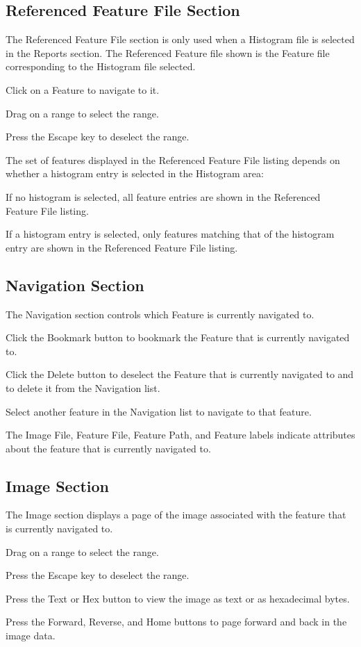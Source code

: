 \documentclass[10pt,twoside]{article}
\begin{document}
\subsection{Referenced Feature File Section}
The Referenced Feature File section is only used when a Histogram file is selected
in the Reports section.
The Referenced Feature file shown is the Feature file corresponding to the Histogram file selected.
\begin{compactitem}
\item Click on a Feature to navigate to it.
\item Drag on a range to select the range.
\item Press the Escape key to deselect the range.
\end{compactitem}
The set of features displayed in the Referenced Feature File listing
depends on whether a histogram entry is selected in the Histogram area:
\begin{compactitem}
\item If no histogram is selected, all feature entries are shown
in the Referenced Feature File listing.
\item If a histogram entry is selected,
only features matching that of the histogram entry are shown
in the Referenced Feature File listing.
\end{compactitem}

\subsection{Navigation Section}
The Navigation section controls which Feature is currently navigated to.
\begin{compactitem}
\item Click the Bookmark button to bookmark the Feature that is currently navigated to.
\item Click the Delete button to deselect the Feature that is currently navigated to
and to delete it from the Navigation list.
\item Select another feature in the Navigation list to navigate to that feature.
\item The Image File, Feature File, Feature Path, and Feature labels
indicate attributes about the feature that is currently navigated to.
\end{compactitem}
\subsection{Image Section}
The Image section displays a page of the image
associated with the feature that is currently navigated to.
\begin{compactitem}
\item Drag on a range to select the range.
\item Press the Escape key to deselect the range.
\item Press the Text or Hex button to view the image as text or as hexadecimal bytes.
\item Press the Forward, Reverse, and Home buttons to page forward and back in the image data.
\end{compactitem}
\end{document}

